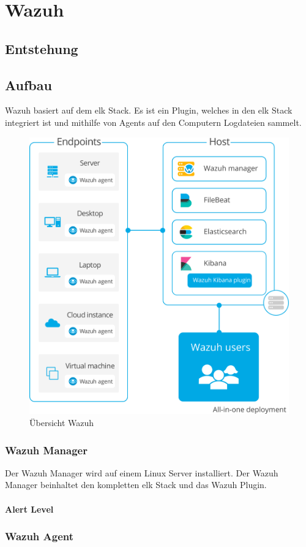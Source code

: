 \chapter{Wazuh}
\section{Entstehung}

\section{Aufbau}
Wazuh basiert auf dem \acrfull{elk} Stack. 
Es ist ein Plugin, welches in den \acrshort{elk} Stack integriert ist und mithilfe von Agents auf den Computern Logdateien sammelt.

\begin{figure}[H]
    \centering
    \includegraphics[width=0.7\linewidth]{../img/aufbau-wazuh.png}
    \caption{Übersicht Wazuh}
\end{figure}

\subsection{Wazuh Manager}
Der Wazuh Manager wird auf einem Linux Server installiert.
Der Wazuh Manager beinhaltet den kompletten \acrshort{elk} Stack und das Wazuh Plugin. 

\subsubsection{Alert Level}
\subsection{Wazuh Agent}
